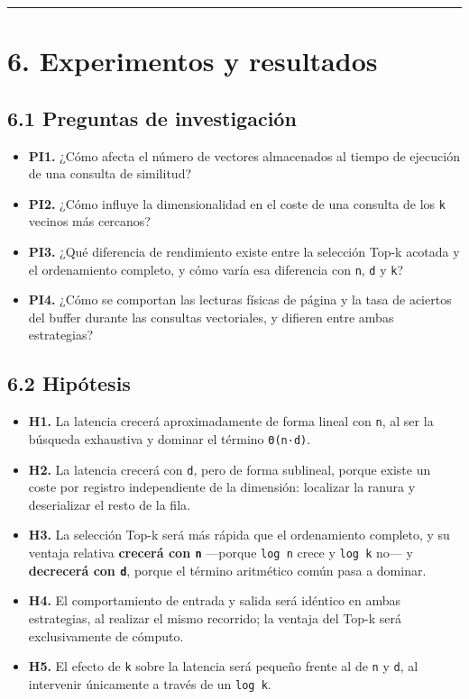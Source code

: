 \documentclass[11pt,a4paper]{article}
\providecommand{\tightlist}{%
  \setlength{\itemsep}{0pt}\setlength{\parskip}{0pt}}
\let\pandocsubsection\subsection
\let\subsection\section
\let\subsubsection\pandocsubsection
\begin{document}
\begin{center}\rule{0.5\linewidth}{0.5pt}\end{center}

\subsection{6. Experimentos y
resultados}\label{6-experimentos-y-resultados}

\subsubsection{6.1 Preguntas de
investigación}\label{61-preguntas-de-investigaciuxf3n}

\begin{itemize}
\tightlist
\item
  \textbf{PI1.} ¿Cómo afecta el número de vectores almacenados al tiempo
  de ejecución de una consulta de similitud?
\item
  \textbf{PI2.} ¿Cómo influye la dimensionalidad en el coste de una
  consulta de los \texttt{k} vecinos más cercanos?
\item
  \textbf{PI3.} ¿Qué diferencia de rendimiento existe entre la selección
  Top-k acotada y el ordenamiento completo, y cómo varía esa diferencia
  con \texttt{n}, \texttt{d} y \texttt{k}?
\item
  \textbf{PI4.} ¿Cómo se comportan las lecturas físicas de página y la
  tasa de aciertos del buffer durante las consultas vectoriales, y
  difieren entre ambas estrategias?
\end{itemize}

\subsubsection{6.2 Hipótesis}\label{62-hipuxf3tesis}

\begin{itemize}
\tightlist
\item
  \textbf{H1.} La latencia crecerá aproximadamente de forma lineal con
  \texttt{n}, al ser la búsqueda exhaustiva y dominar el término
  \texttt{Θ(n·d)}.
\item
  \textbf{H2.} La latencia crecerá con \texttt{d}, pero de forma
  sublineal, porque existe un coste por registro independiente de la
  dimensión: localizar la ranura y deserializar el resto de la fila.
\item
  \textbf{H3.} La selección Top-k será más rápida que el ordenamiento
  completo, y su ventaja relativa \textbf{crecerá con \texttt{n}}
  ---porque \texttt{log\ n} crece y \texttt{log\ k} no--- y
  \textbf{decrecerá con \texttt{d}}, porque el término aritmético común
  pasa a dominar.
\item
  \textbf{H4.} El comportamiento de entrada y salida será idéntico en
  ambas estrategias, al realizar el mismo recorrido; la ventaja del
  Top-k será exclusivamente de cómputo.
\item
  \textbf{H5.} El efecto de \texttt{k} sobre la latencia será pequeño
  frente al de \texttt{n} y \texttt{d}, al intervenir únicamente a
  través de un \texttt{log\ k}.
\end{itemize}
\end{document}

